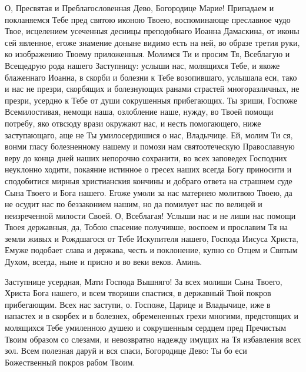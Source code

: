 

О, Пресвятая и Преблагословенная Дево, Богородице Марие! Припадаем и покланяемся Тебе пред святою иконою Твоею, воспоминающе преславное чудо Твое, исцелением усеченныя десницы преподобнаго Иоанна Дамаскина, от иконы сей явленное, егоже знамение доныне видимо есть на ней, во образе третия руки, ко изображению Твоему приложенныя. Молимся Ти и просим Тя, Всеблагую и Всещедрую рода нашего Заступницу: услыши нас, молящихся Тебе, и якоже блаженнаго Иоанна, в скорби и болезни к Тебе возопившаго, услышала еси, тако и нас не презри, скорбящих и болезнующих ранами страстей многоразличных, не презри, усердно к Тебе от души сокрушенныя прибегающих. Ты зриши, Госпоже Всемилостивая, немощи наша, озлобление наше, нужду, во Твоей помощи потребу, яко отвсюду врази окружают нас, и несть помогающего, ниже заступающаго, аще не Ты умилосердишися о нас, Владычице. Ей, молим Ти ся, вонми гласу болезненному нашему и помози нам святоотеческую Православную веру до конца дней наших непорочно сохранити, во всех заповедех Господних неуклонно ходити, покаяние истинное о гресех наших всегда Богу приносити и сподобитися мирныя христианския кончины и добраго ответа на страшнем суде Сына Твоего и Бога нашего. Егоже умоли за нас матернею молитвою Твоею, да не осудит нас по беззаконием нашим, но да помилует нас по велицей и неизреченной милости Своей. О, Всеблагая! Услыши нас и не лиши нас помощи Твоея державныя, да, Тобою спасение получивше, воспоем и прославим Тя на земли живых и Рождшагося от Тебе Искупителя нашего, Господа Иисуса Христа, Емуже подобает слава и держава, честь и поклонение, купно со Отцем и Святым Духом, всегда, ныне и присно и во веки веков. Аминь.
\mychapterending

 



Заступнице усердная, Мати Господа Вышняго! За всех молиши Сына Твоего, Христа Бога нашего, и всем твориши спастися, в державный Твой покров прибегающим. Всех нас заступи, о. Госпоже, Царице и Владычице, иже в напастех и в скорбех и в болезнех, обремененных грехи многими, предстоящих и молящихся Тебе умиленною душею и сокрушенным сердцем пред Пречистым Твоим образом со слезами, и невозвратно надежду имущих на Тя избавления всех зол. Всем полезная даруй и вся спаси, Богородице Дево: Ты бо еси Божественный покров рабом Твоим.


